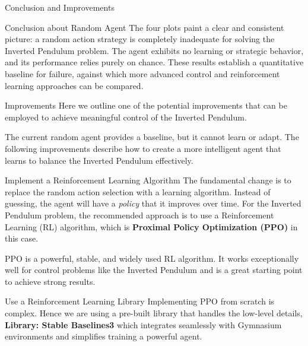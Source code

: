 \begin{frame}[fragile]{Conclusion and Improvements}
\protect{}\label{conclusion-and-improvements}
\begin{block}{Conclusion about Random Agent}
\protect{}\label{conclusion-about-random-agent}
The four plots paint a clear and consistent picture: a random action
strategy is completely inadequate for solving the Inverted Pendulum
problem. The agent exhibits no learning or strategic behavior, and its
performance relies purely on chance. These results establish a
quantitative baseline for failure, against which more advanced control
and reinforcement learning approaches can be compared.
\end{block}

\begin{block}{Improvements}
\protect{}\label{improvements}
Here we outline one of the potential improvements that can be employed
to achieve meaningful control of the Inverted Pendulum.

The current random agent provides a baseline, but it cannot learn or
adapt. The following improvements describe how to create a more
intelligent agent that learns to balance the Inverted Pendulum
effectively.

\begin{block}{Implement a Reinforcement Learning Algorithm}
\protect{}\label{implement-a-reinforcement-learning-algorithm}
The fundamental change is to replace the random action selection with a
learning algorithm. Instead of guessing, the agent will have a
\emph{policy} that it improves over time. For the Inverted Pendulum
problem, the recommended approach is to use a Reinforcement Learning
(RL) algorithm, which is \textbf{Proximal Policy Optimization (PPO)} in
this case.

PPO is a powerful, stable, and widely used RL algorithm. It works
exceptionally well for control problems like the Inverted Pendulum and
is a great starting point to achieve strong results.
\end{block}

\begin{block}{Use a Reinforcement Learning Library}
\protect{}\label{use-a-reinforcement-learning-library}
Implementing PPO from scratch is complex. Hence we are using a pre-built
library that handles the low-level details, \textbf{Library: Stable
Baselines3} which integrates seamlessly with Gymnasium environments and
simplifies training a powerful agent.
\end{block}


\end{block}
\end{frame}

